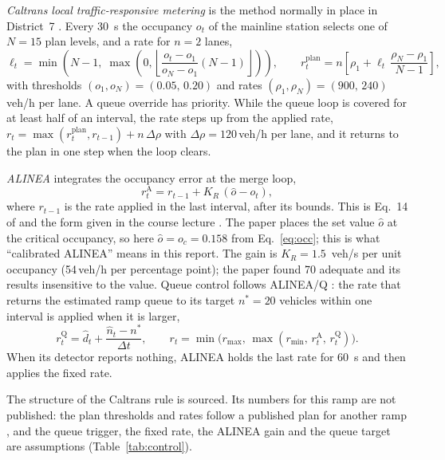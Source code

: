 \documentclass[11pt,letterpaper]{article}
\newcommand{\vehh}{\,veh/h}
\begin{document}
\emph{Caltrans local traffic-responsive metering} is the method normally in place in
District~7 \cite{d7report2014,topd2112,tom2025}. Every 30~s the occupancy $o_t$ of the
mainline station selects one of $N=15$ plan levels, and a rate for $n=2$ lanes,
\begin{equation}
\ell_t=\min\!\left(N-1,\;\max\!\left(0,\left\lfloor
\frac{o_t-o_1}{o_N-o_1}(N-1)\right\rfloor\right)\right),\qquad
r^\text{plan}_t=n\left[\rho_1+\ell_t\,\frac{\rho_N-\rho_1}{N-1}\right],
\label{eq:plan}
\end{equation}
with thresholds $(o_1,o_N)=(0.05,\,0.20)$ and rates $(\rho_1,\rho_N)=(900,\,240)$\vehh{}
per lane. A queue override has priority. While the queue loop is covered for at least
half of an interval, the rate steps up from the applied rate,
$r_t=\max(r^\text{plan}_t,r_{t-1})+n\,\Delta\rho$ with $\Delta\rho=120$\vehh{} per lane,
and it returns to the plan in one step when the loop clears.

\emph{ALINEA} \cite{papageorgiou1991} integrates the occupancy error at the merge loop,
\begin{equation}
r^\text{A}_{t}=r_{t-1}+K_R\,(\hat o-o_t),
\label{eq:alinea}
\end{equation}
where $r_{t-1}$ is the rate applied in the last interval, after its bounds. This is
Eq.~14 of \cite{papageorgiou1991} and the form given in the course lecture \cite{ma2026}.
The paper places the set value $\hat o$ at the critical occupancy, so here
$\hat o=o_c=0.158$ from Eq.~\eqref{eq:occ}; this is what ``calibrated ALINEA'' means in
this report. The gain is $K_R=1.5$~veh/s per unit occupancy (54\vehh{} per percentage
point); the paper found 70 adequate and its results insensitive to the value. Queue
control follows ALINEA/Q \cite{smaragdis2003}: the rate that returns the estimated ramp
queue to its target $n^*=20$ vehicles within one interval is applied when it is larger,
\begin{equation}
r^\text{Q}_t=\hat d_t+\frac{\hat n_t-n^*}{\Delta t},\qquad
r_t=\min\bigl(r_\text{max},\,\max(r_\text{min},\,r^\text{A}_t,\,r^\text{Q}_t)\bigr).
\label{eq:alineaq}
\end{equation}
When its detector reports nothing, ALINEA holds the last rate for 60~s and then applies
the fixed rate.

The structure of the Caltrans rule is sourced. Its numbers for this ramp are not
published: the plan thresholds and rates follow a published plan for another ramp
\cite{shladover2017}, and the queue trigger, the fixed rate, the ALINEA gain and the
queue target are assumptions (Table~\ref{tab:control}).
\end{document}
